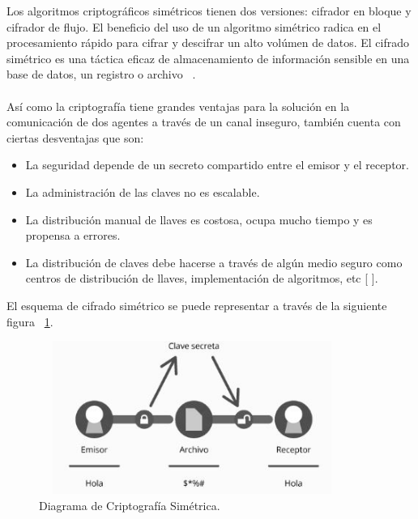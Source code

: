 Los algoritmos criptográficos simétricos tienen dos versiones: cifrador en bloque y cifrador de flujo. El beneficio del uso de un algoritmo simétrico radica en el procesamiento rápido para cifrar y descifrar un alto volúmen de datos. El cifrado simétrico es una táctica eficaz de almacenamiento de información sensible en una base de datos, un registro o archivo  ~\cite{sime}. 
\\  \\
Así como la criptografía tiene grandes ventajas para la solución en la comunicación de dos agentes a través de un canal inseguro, también cuenta con ciertas desventajas que son: 

\begin{itemize}
	\item La seguridad depende de un secreto compartido entre el emisor y el receptor.
	\item La administración de las claves no es escalable.
	\item La distribución manual de llaves es costosa, ocupa mucho tiempo y es propensa a errores.
	\item La distribución de claves debe hacerse a través de algún medio seguro como centros de distribución de llaves, implementación de algoritmos, etc [ ]. 
\end{itemize}

El esquema de cifrado simétrico se puede representar a través de la siguiente figura ~\ref{fig:2-3-1}.
\begin{figure}[H]
\centering
	\includegraphics[width=10cm, height=5cm]{./images/Cripto_Simetrica.jpg}
	\caption{Diagrama de Criptografía Simétrica.}
	\label{fig:2-3-1}
\end{figure}


